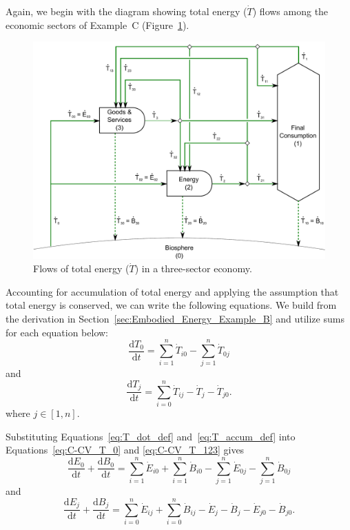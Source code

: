 Again, we begin with the diagram showing total energy ($\dot{T}$) flows
among the economic sectors of Example~C (Figure~\ref{fig:C_total_energy}).

\begin{landscape}
\begin{figure}[!ht]
\includegraphics[width=0.8\linewidth]{Part_1/Chapter_Embodied/images/3_sector_embodied_energy.pdf}
\caption[Flows of total energy in a three-sector economy]{Flows of total energy ($\dot{T}$) in a three-sector economy.}
\label{fig:C_total_energy}
\end{figure}
\end{landscape}

Accounting for accumulation of total energy and 
applying the assumption that total energy is conserved, 
we can write the following equations.
We build from the derivation in Section~\ref{sec:Embodied_Energy_Example_B}
and utilize sums for each equation below:
%
\begin{equation} \label{eq:C-CV_T_0}
	\frac{\mathrm{d}T_{0}}{\mathrm{d}t} 	 
	= \sum\limits_{i=1}^{n} \dot{T}_{i0}
	- \sum\limits_{j=1}^{n} \dot{T}_{0j}
\end{equation}
%
and
%
\begin{equation} \label{eq:C-CV_T_123}
	\frac{\mathrm{d}T_{j}}{\mathrm{d}t} 	 
	= \sum\limits_{i=0}^{n} \dot{T}_{ij}
	- \dot{T}_{j}
	- \dot{T}_{j0}.
\end{equation}
%
where $j \in [1, n]$.

Substituting Equations~\ref{eq:T_dot_def} 
and~\ref{eq:T_accum_def} into 
Equations~\ref{eq:C-CV_T_0} and
\ref{eq:C-CV_T_123} gives
%
\begin{equation} \label{eq:C-CV_dB_0}
	\frac{\mathrm{d}E_{0}}{\mathrm{d}t}
	+ \frac{\mathrm{d}B_{0}}{\mathrm{d}t} 	 
	= \sum\limits_{i=1}^{n} \dot{E}_{i0}
	+ \sum\limits_{i=1}^{n} \dot{B}_{i0}
	- \sum\limits_{j=1}^{n} \dot{E}_{0j}
	- \sum\limits_{j=1}^{n} \dot{B}_{0j}
\end{equation}
%
and
%
\begin{equation} \label{eq:C-CV_dB_123}
	\frac{\mathrm{d}E_{j}}{\mathrm{d}t}
	+ \frac{\mathrm{d}B_{j}}{\mathrm{d}t} 	 
	= \sum\limits_{i=0}^{n} \dot{E}_{ij}
	+ \sum\limits_{i=0}^{n} \dot{B}_{ij}
	- \dot{E}_{j}
	- \dot{B}_{j}
	- \dot{E}_{j0}
	- \dot{B}_{j0}.
\end{equation}

